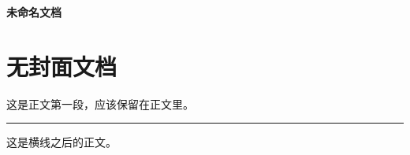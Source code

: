 \documentclass[zihao=-4]{ctexart}
\numberwithin{equation}{section}
\numberwithin{figure}{section}
\numberwithin{table}{section}
\theoremstyle{plain}
\begin{document}
\begin{titlepage}

\pagecolor{coverbg}

\thispagestyle{empty}

\color{black}

\centering

\vspace*{0.30\textheight}

{\bfseries 未命名文档}\\[0.9em]

\vspace{3.2em}

\vfill

\vfill

\vspace*{1.1cm}

\end{titlepage}

\nopagecolor

\setcounter{page}{1}


\tableofcontents

\clearpage


\setcounter{page}{1}

\section{无封面文档}

这是正文第一段，应该保留在正文里。

\noindent\rule{\linewidth}{0.4pt}

这是横线之后的正文。
\end{document}
